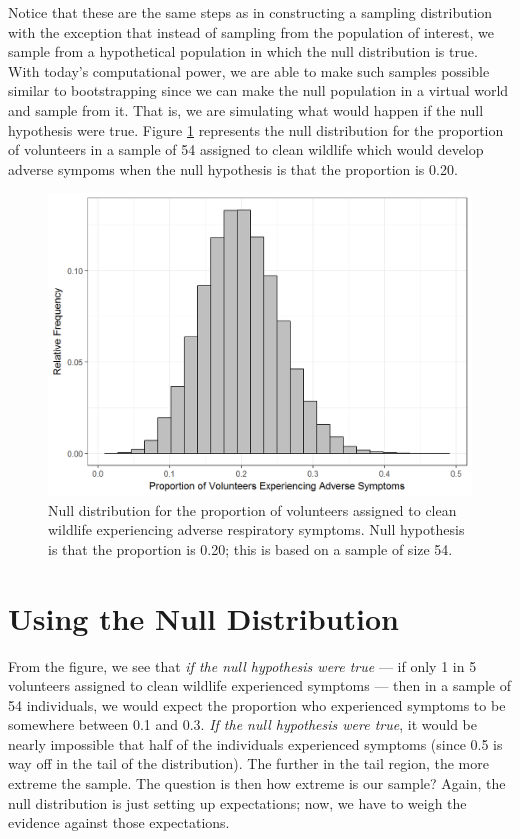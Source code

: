 \documentclass[]{book}
\theoremstyle{definition}
\theoremstyle{definition}
\theoremstyle{remark}
\begin{document}
Notice that these are the same steps as in constructing a sampling
distribution with the exception that instead of sampling from the
population of interest, we sample from a hypothetical population in
which the null distribution is true. With today's computational power,
we are able to make such samples possible similar to bootstrapping since
we can make the null population in a virtual world and sample from it.
That is, we are simulating what would happen if the null hypothesis were
true. Figure \ref{fig:nulldistns-deepwater-null} represents the null
distribution for the proportion of volunteers in a sample of 54 assigned
to clean wildlife which would develop adverse sympoms when the null
hypothesis is that the proportion is 0.20.

\begin{figure}

{\centering \includegraphics[width=0.8\linewidth]{./Images/nulldistns-deepwater-null-1} 

}

\caption{Null distribution for the proportion of volunteers assigned to clean wildlife experiencing adverse respiratory symptoms.  Null hypothesis is that the proportion is 0.20; this is based on a sample of size 54.}\label{fig:nulldistns-deepwater-null}
\end{figure}

\section{Using the Null Distribution}\label{using-the-null-distribution}

From the figure, we see that \emph{if the null hypothesis were true} ---
if only 1 in 5 volunteers assigned to clean wildlife experienced
symptoms --- then in a sample of 54 individuals, we would expect the
proportion who experienced symptoms to be somewhere between 0.1 and 0.3.
\emph{If the null hypothesis were true}, it would be nearly impossible
that half of the individuals experienced symptoms (since 0.5 is way off
in the tail of the distribution). The further in the tail region, the
more extreme the sample. The question is then how extreme is our sample?
Again, the null distribution is just setting up expectations; now, we
have to weigh the evidence against those expectations.
\end{document}
